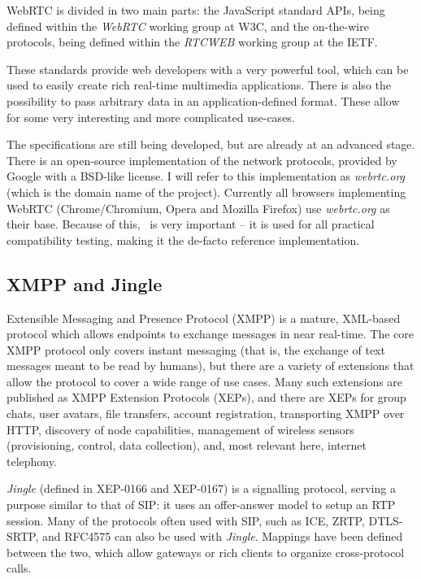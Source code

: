 \documentclass[twoside,openright,a4paper,12pt,english]{article}
\begin{document}
WebRTC is divided in two main parts: the JavaScript standard APIs, being defined within
the \emph{WebRTC} working group\cite{webrtc-wg} at W3C,
and the on-the-wire protocols, being defined within
the \emph{RTCWEB} working group\cite{rtcweb-wg} at the IETF.

These standards provide web developers with a very powerful tool, which
can be used to easily create rich real-time multimedia applications.
There is also the possibility to pass arbitrary data in an 
application-defined format. These allow for some very interesting and more
complicated use-cases. 

The specifications are still being developed, but are already at an advanced stage. There is
an open-source implementation of the network protocols, provided by Google with
a BSD-like license. I will refer to this implementation as \emph{webrtc.org}
(which is the domain name of the project). Currently all browsers implementing
WebRTC (Chrome/Chromium, Opera and Mozilla Firefox) 
use \emph{webrtc.org} as their base. Because of this, \wrtc\ is very important -- it is
used for all practical compatibility testing, making it the de-facto reference implementation.




\subsection{XMPP and Jingle}
Extensible Messaging and Presence Protocol (XMPP)\cite{rfc6120} is a mature,
XML-based protocol which allows endpoints
to exchange messages in near real-time. The core XMPP protocol only covers instant messaging (that is, the exchange of
text messages meant to be read by humans), but there are a variety of extensions that allow the protocol
to cover a wide range of use cases. Many such extensions are published as XMPP Extension Protocols (XEPs), and there are XEPs for
group chats, user avatars, file transfers, account registration, transporting
XMPP over HTTP, discovery of node capabilities, management of  wireless sensors (provisioning, control, data collection),
and, most relevant here, internet telephony.

\emph{Jingle} (defined in XEP-0166\cite{jingle166} and XEP-0167\cite{jingle167})
is a signalling protocol, serving a purpose similar to that of SIP: it uses an
offer-answer model to setup an RTP session. Many of the
protocols often used with SIP, such as ICE\cite{ice}, ZRTP\cite{zrtp}, DTLS-SRTP\cite{rfc5763}, and
RFC4575\cite{rfc4575} can also be used with \emph{Jingle}. Mappings
have been defined between the two\cite{stoxmedia}, which allow gateways or rich
clients to organize cross-protocol calls.
\end{document}
